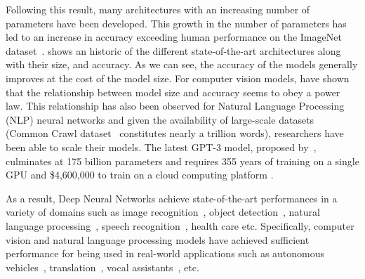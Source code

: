 Following this result, many architectures with an increasing number of parameters have been developed.
This growth in the number of parameters has led to an increase in accuracy exceeding human performance on the ImageNet dataset~\cite{he2015delving}.
 shows an historic of the different state-of-the-art architectures along with their size, and accuracy.
As we can see, the accuracy of the models generally improves at the cost of the model size.
For computer vision models, \citet{tan2019efficientnet} have shown that the relationship between model size and accuracy seems to obey a power law.
This relationship has also been observed for Natural Language Processing (NLP) neural networks \cite{rosenfeld2020a,kaplan2020scaling} and given the availability of large-scale datasets (Common Crawl dataset~\cite{raffel2019exploring} constitutes nearly a trillion words), researchers have been able to scale their models.
The latest GPT-3 model, proposed by~\citet{brown2020language}, culminates at 175 billion parameters and requires 355 years of training on a single GPU and \$4,600,000 to train on a cloud computing platform \cite{li2020overview}.

As a result, Deep Neural Networks achieve state-of-the-art performances in a variety of domains such as image recognition~\cite{lecun1998gradient,krizhevsky2012imagenet,he2016deep,tan2019efficientnet}, object detection~\cite{redmon2016you,liu2016ssd,redmon2017yolo9000}, natural language processing~\cite{merity2016pointer,radford2018Language,brown2020language}, speech recognition~\cite{hinton2012deep,abdel2014convolutional,yu2016automatic}, health care \cite{faust2018deep} etc.
Specifically, computer vision and natural language processing models have achieved sufficient performance for being used in real-world applications such as autonomous vehicles~\cite{fagnant2015preparing}, translation~\cite{wu2016google}, vocal assistants~\cite{li2017acoustic}, etc.

